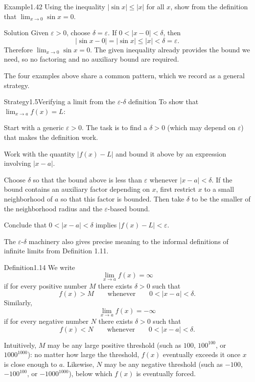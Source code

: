 \documentclass[a4paper,12pt,oneside]{memoir}
\begin{document}
\begin{workedexample}
\begin{envexample}{Example}{1.42}{}
Using the inequality \(|\sin x| \le |x|\) for all \(x\), show from the definition that \(\lim_{x \to 0} \sin x = 0\).
\end{envexample}
\begin{envsolution}{Solution}{}{}
Given \(\varepsilon > 0\), choose \(\delta = \varepsilon\). If \(0 < |x - 0| < \delta\), then \[ |\sin x - 0| = |\sin x| \le |x| < \delta = \varepsilon. \] Therefore \(\lim_{x \to 0} \sin x = 0\). The given inequality already provides the bound we need, so no factoring and no auxiliary bound are required.
\end{envsolution}
\end{workedexample}
The four examples above share a common pattern, which we record as a general strategy.

\begin{envstrategy}{Strategy}{1.5}{Verifying a limit from the \(\varepsilon\)-\(\delta\) definition}
To show that \(\lim_{x \to a} f(x) = L\):

\begin{steps}
  \item Start with a generic \(\varepsilon > 0\). The task is to find a \(\delta > 0\) (which may depend on \(\varepsilon\)) that makes the definition work.
  \item Work with the quantity \(|f(x) - L|\) and bound it above by an expression involving \(|x - a|\).
  \item Choose \(\delta\) so that the bound above is less than \(\varepsilon\) whenever \(|x - a| < \delta\). If the bound contains an auxiliary factor depending on \(x\), first restrict \(x\) to a small neighborhood of \(a\) so that this factor is bounded. Then take \(\delta\) to be the smaller of the neighborhood radius and the \(\varepsilon\)-based bound.
  \item Conclude that \(0 < |x - a| < \delta\) implies \(|f(x) - L| < \varepsilon\).
\end{steps}
\end{envstrategy}
The \(\varepsilon\)-\(\delta\) machinery also gives precise meaning to the informal definitions of infinite limits from Definition 1.11.

\begin{envdefinition}{Definition}{1.14}{}
We write \[ \lim_{x \to a} f(x) = \infty \] if for every positive number \(M\) there exists \(\delta > 0\) such that \[ f(x) > M \qquad \text{whenever} \qquad 0 < |x - a| < \delta. \] Similarly, \[ \lim_{x \to a} f(x) = -\infty \] if for every negative number \(N\) there exists \(\delta > 0\) such that \[ f(x) < N \qquad \text{whenever} \qquad 0 < |x - a| < \delta. \]
\end{envdefinition}
Intuitively, \(M\) may be any large positive threshold (such as \(100\), \(100^{100}\), or \(1000^{1000}\)): no matter how large the threshold, \(f(x)\) eventually exceeds it once \(x\) is close enough to \(a\). Likewise, \(N\) may be any negative threshold (such as \(-100\), \(-100^{100}\), or \(-1000^{1000}\)), below which \(f(x)\) is eventually forced.
\end{document}
